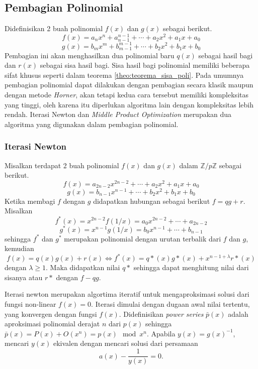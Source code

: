 \subsection{ Pembagian Polinomial}
Didefinisikan 2 buah polinomial $f(x)$ dan $g(x)$ sebagai berikut.
$$ f(x) = a_n x^n + a_{n-1}^{n-1} + \cdots + a_2x^2 + a_1x + a_0 $$
$$ g(x) = b_m x^m + b_{m-1}^{m-1} + \cdots + b_2x^2 + b_1x + b_0 $$
Pembagian ini akan menghasilkan dua polinomial baru $ q(x) $ sebagai hasil bagi dan $ r(x) $ sebagai sisa hasil bagi. Sisa hasil bagi polinomial memiliki beberapa sifat khusus seperti dalam teorema \ref{theo:teorema_sisa_poli}.
Pada umumnya pembagian polinomial dapat dilakukan dengan pembagian secara klasik maupun dengan metode \textit{Horner}, akan tetapi kedua cara tersebut memiliki kompleksitas yang tinggi, oleh karena itu diperlukan algoritma lain dengan kompleksitas lebih rendah. Iterasi Newton dan \textit{Middle Product Optimization} merupakan dua algoritma yang digunakan dalam pembagian polinomial.

\subsubsection{ Iterasi Newton}
\indent Misalkan terdapat 2 buah polinomial $f(x)$ dan $g(x)$ dalam $ \mathbb{Z}/p\mathbb{Z} $ sebagai berikut.
$$ f(x) = a_{2n-2} x^{2n-2} + \cdots + a_2x^2 + a_1x + a_0 $$
$$ g(x) = b_{n-1} x^{n-1} + \cdots + b_2x^2 + b_1x + b_0 $$
Ketika membagi $ f $ dengan $ g $ didapatkan hubungan sebagai berikut $ f = qg + r $.
Misalkan 
$$ f^*(x) = x^{2n-2}f(1/x) = a_0 x^{2n-2} + \cdots + a_{2n-2} $$
$$ g^*(x) = x^{n-1}g(1/x) = b_0 x^{n-1} + \cdots + b_{n-1} $$
sehingga $ f^* $ dan $ g^* $ merupakan polinomial dengan urutan terbalik dari $ f $ dan $ g $, kemudian
\begin{equation}
	f(x) = q(x)g(x) + r(x) \iff f^*(x) = q*(x) g*(x) + x^{n-1+\lambda} r*(x)
	\label{eq:persamaan_reversal}
\end{equation}
dengan $ \lambda \geq 1 $. Maka didapatkan nilai $ q* $ sehingga dapat menghitung nilai dari sisanya atau $ r* $ dengan $ f-qg $.

Iterasi newton merupakan algortima iteratif untuk mengaproksimasi solusi dari fungsi non-linear $ f(x) = 0 $. Iterasi dimulai dengan dugaan awal nilai tertentu, yang konvergen dengan fungsi $ f(x) $. 
Didefinisikan \textit{power series} $ \bar{p}(x) $ adalah aproksimasi polinomial derajat $ n $ dari $ p(x) $ sehingga $ \bar{p}(x) = P(x) + O(x^n) = p(x) \mod{x^n} $. 
Apabila $ y(x) = g(x)^{-1} $, mencari $ y(x) $ ekivalen dengan mencari solusi dari persamaan $$ a(x) - \frac{1}{y(x)} = 0. $$

